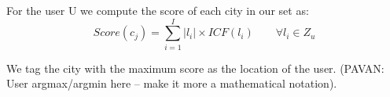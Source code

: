 For the user U we compute the score of each city in our set as:
\begin{equation}
	Score(c_{j}) = \sum_{i=1}^I |l_{i}| \times ICF(l_{i})\qquad  \forall l_{i} \in Z_{u}
\end{equation}

We tag the city with the maximum score as the location of the user. (PAVAN: User argmax/argmin here -- make it more a mathematical notation).




